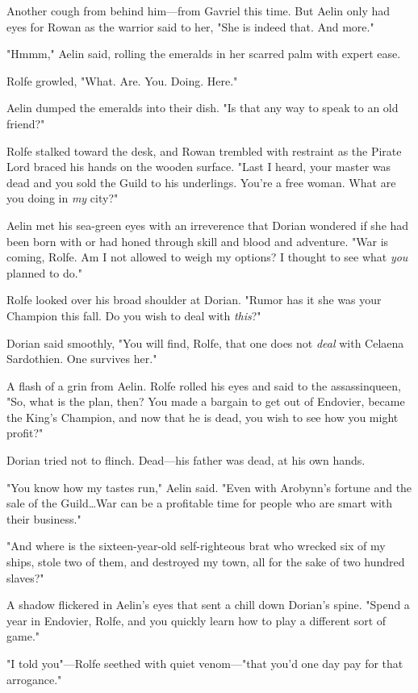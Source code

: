 Another cough from behind him---from Gavriel this time.
But Aelin only had eyes for Rowan as the warrior said to her, "She is indeed that.
And more."

"Hmmm," Aelin said, rolling the emeralds in her scarred palm with expert ease.

Rolfe growled, "What.
Are.
You.
Doing.
Here."

Aelin dumped the emeralds into their dish.
"Is that any way to speak to an old friend?"

Rolfe stalked toward the desk, and Rowan trembled with restraint as the Pirate Lord braced his hands on the wooden surface.
"Last I heard, your master was dead and you sold the Guild to his underlings.
You're a free woman.
What are you doing in \emph{my} city?"

Aelin met his sea-green eyes with an irreverence that Dorian wondered if she had been born with or had honed through skill and blood and adventure.
"War is coming, Rolfe.
Am I not allowed to weigh my options?
I thought to see what \emph{you} planned to do."

Rolfe looked over his broad shoulder at Dorian.
"Rumor has it she was your Champion this fall.
Do you wish to deal with \emph{this}?"

Dorian said smoothly, "You will find, Rolfe, that one does not \emph{deal} with Celaena Sardothien.
One survives her."

A flash of a grin from Aelin.
Rolfe rolled his eyes and said to the assassinqueen, "So, what is the plan, then?
You made a bargain to get out of Endovier, became the King's Champion, and now that he is dead, you wish to see how you might profit?"

Dorian tried not to flinch.
Dead---his father was dead, at his own hands.

"You know how my tastes run," Aelin said.
"Even with Arobynn's fortune and the sale of the Guild\ldots War can be a profitable time for people who are smart with their business."

"And where is the sixteen-year-old self-righteous brat who wrecked six of my ships, stole two of them, and destroyed my town, all for the sake of two hundred slaves?"

A shadow flickered in Aelin's eyes that sent a chill down Dorian's spine.
"Spend a year in Endovier, Rolfe, and you quickly learn how to play a different sort of game."

"I told you"---Rolfe seethed with quiet venom---"that you'd one day pay for that arrogance."

